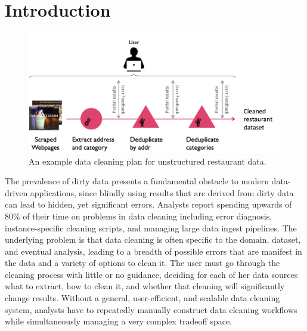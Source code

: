 \section{Introduction}\label{sec:intro}

\begin{figure}[t]
\centering
\vspace{-0.5cm}
\includegraphics[width = .5\textwidth]{figs/locu_example.png}
\vspace{-0.7cm}
\caption{An example data cleaning plan for unstructured restaurant data.}
\label{fig:ex-plan}
\end{figure}

%
%
The prevalence of dirty data presents a fundamental obstacle to modern data-driven applications, since 
blindly using results that are derived from dirty data can lead to hidden, yet significant errors.
Analysts report spending upwards of 80\% of their time on problems in data cleaning \cite{kandel2012} including 
error diagnosis, instance-specific cleaning scripts, and managing large data ingest pipelines.
The underlying problem is that data cleaning is often specific to the domain, dataset, and eventual analysis,
leading to a breadth of possible errors that are manifest in the data and a variety of options to clean it.
The user must go through the cleaning process with little or no guidance, deciding for each of her data sources what to extract, how to clean it,
and whether that cleaning will significantly change results. 
Without a general, user-efficient, and scalable data cleaning system, analysts have to repeatedly manually construct data cleaning workflows while simultaneously managing a very complex tradeoff space.

